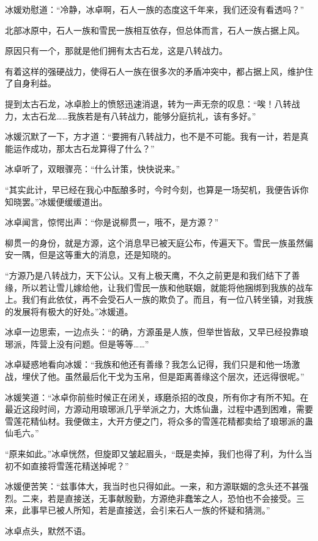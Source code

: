 \begin{this_body}
冰媛劝慰道：“冷静，冰卓啊，石人一族的态度这千年来，我们还没有看透吗？”

北部冰原中，石人一族和雪民一族相互依存，但总体而言，石人一族占据上风。

原因只有一个，那就是他们拥有太古石龙，这是八转战力。

有着这样的强硬战力，使得石人一族在很多次的矛盾冲突中，都占据上风，维护住了自身利益。

提到太古石龙，冰卓脸上的愤怒迅速消退，转为一声无奈的叹息：“唉！八转战力，太古石龙……我族若是有八转战力，能够分庭抗礼，该有多好。”

冰媛沉默了一下，方才道：“要拥有八转战力，也不是不可能。我有一计，若是真能运作成功，那太古石龙算得了什么？”

冰卓听了，双眼骤亮：“什么计策，快快说来。”

“其实此计，早已经在我心中酝酿多时，今时今刻，也算是一场契机，我便告诉你知晓罢。”冰媛便缓缓道出。

冰卓闻言，惊愕出声：“你是说柳贯一，哦不，是方源？”

柳贯一的身份，就是方源，这个消息早已被天庭公布，传遍天下。雪民一族虽然偏安一隅，但是这等重大的消息，还是知晓的。

“方源乃是八转战力，天下公认。又有上极天鹰，不久之前更是和我们结下了善缘，所以若让雪儿嫁给他，让我们雪民一族和他联姻，就能将他捆绑到我族的战车上。我们有此依仗，再不会受石人一族的欺负了。而且，有一位八转坐镇，对我族的发展将有极大的好处。”冰媛道。

冰卓一边思索，一边点头：“的确，方源虽是人族，但举世皆敌，又早已经投靠琅琊派，阵营上没有问题。但是等等……”

冰卓疑惑地看向冰媛：“我族和他还有善缘？我怎么记得，我们只是和他一场激战，埋伏了他。虽然最后化干戈为玉帛，但是距离善缘这个层次，还远得很呢。”

冰媛笑道：“冰卓你前些时候正在闭关，琢磨杀招的改良，所有你才有所不知。在最近这段时间，方源动用琅琊派几乎举派之力，大炼仙蛊，过程中遇到困难，需要雪莲花精仙材。我便做主，大开方便之门，将众多的雪莲花精都卖给了琅琊派的蛊仙毛六。”

“原来如此。”冰卓恍然，但旋即又皱起眉头，“既是卖掉，我们也得了利，为什么当初不如直接将雪莲花精送掉呢？”

冰媛便苦笑：“兹事体大，我当时也只得如此。一来，和方源联姻的念头还不甚强烈。二来，若是直接送，无事献殷勤，方源绝非蠢笨之人，恐怕也不会接受。三来，此事早已被人所知，若是直接送，会引来石人一族的怀疑和猜测。”

冰卓点头，默然不语。


\end{this_body}
